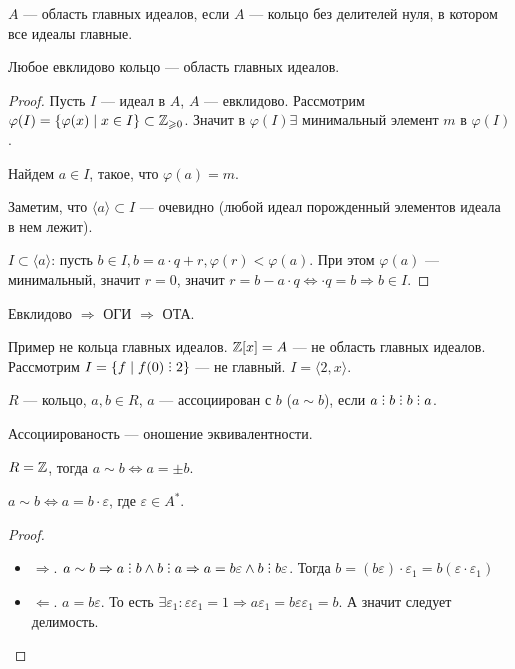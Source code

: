 \begin{definition}
    $A$ --- область главных идеалов, если  $A$ --- кольцо без делителей нуля, в котором все идеалы главные.
\end{definition}
\begin{theorem}
    Любое евклидово кольцо --- область главных идеалов.
\end{theorem}
\begin{proof}
    Пусть $I$ --- идеал в  $A$,  $A$ --- евклидово. Рассмотрим  $\varphi(I) = \{\varphi(x) \mid x\in I\} \subset \mathbb{Z}_{\geqslant 0}$. Значит в $\varphi(I) \exists$ минимальный элемент $m$ в  $\varphi(I)$.  

    Найдем $a \in I$, такое, что  $\varphi(a) = m$. 

    Заметим, что  $\langle a \rangle \subset I$ --- очевидно (любой идеал порожденный элементов идеала в нем лежит).

    $I \subset \langle a \rangle$: пусть $b \in I, b = a \cdot q + r, \varphi(r) < \varphi(a)$. При этом $\varphi(a)$ --- минимальный, значит  $r = 0$, значит  $r = b - a \cdot q \iff \cdot q = b \Rightarrow b \in I$.
\end{proof}
\slashn
Евклидово $\Rightarrow$ ОГИ  $\Rightarrow$ ОТА.
\begin{remark}
    Пример не кольца главных идеалов. $\mathbb{Z}[x] = A$ --- не область главных идеалов. Рассмотрим  $I = \{f \mid f(0) \divby 2\}$ --- не главный.  $I = \langle 2, x \rangle$.    
\end{remark}
\begin{definition}
    $R$ --- кольцо,  $a, b \in R$,  $a$ --- ассоциирован с  $b$ ($a \sim b$), если $a \divby b \divby b \divby a$.
\end{definition}
\begin{remark}
    Ассоциированость --- оношение эквивалентности.
\end{remark}
\begin{example}
    $R= \mathbb{Z}$, тогда  $a \sim b \iff a = \pm b$.
\end{example}
\begin{lemma}
    $a \sim b \iff a = b \cdot \varepsilon$, где  $\varepsilon \in A^*$.
\end{lemma}
\begin{proof}
    \slashn
    \begin{itemize}
        \item  $\Rightarrow$.  $a \sim b \Rightarrow a \divby b \land b \divby a \Rightarrow a = b \varepsilon \land b \divby b \varepsilon$. Тогда $b = (b \varepsilon) \cdot \varepsilon_1 = b (\varepsilon \cdot \varepsilon_1)$
        \item $\Leftarrow$.  $a = b \varepsilon$. То есть  $\exists \varepsilon_1: \varepsilon \varepsilon_1 = 1 \Rightarrow a \varepsilon_1 = b \varepsilon \varepsilon_1 = b$. А значит следует делимость.
    \end{itemize}
\end{proof}
